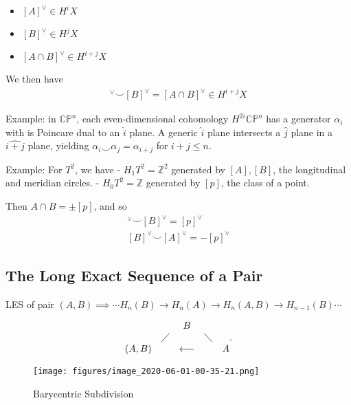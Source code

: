 \begin{itemize}
\tightlist
\item
  \([A]^\vee\in H^i X\)
\item
  \([B]^\vee\in H^j X\)
\item
  \([A\cap B]^\vee\in H^{i+j}X\)
\end{itemize}

We then have
\begin{align*}
[A]^\vee\smile [B]^\vee= [A\cap B]^\vee\in H^{i+j} X
\end{align*}

Example: in \({\mathbb{CP}}^n\), each even-dimensional cohomology
\(H^{2i}{\mathbb{CP}}^n\) has a generator \(\alpha_i\) with is Poincare
dual to an \(\widehat{i}\) plane. A generic \(\widehat{i}\) plane
intersects a \(\widehat{j}\) plane in a \(\widehat{i+j}\) plane,
yielding \(\alpha_i \smile \alpha_j = \alpha_{i+j}\) for \(i+j \leq n\).

Example: For \(T^2\), we have - \(H_1T^2 = {\mathbb{Z}}^2\) generated by
\([A], [B]\), the longitudinal and meridian circles. -
\(H_0T^2 = {\mathbb{Z}}\) generated by \([p]\), the class of a point.

Then \(A\cap B = \pm [p]\), and so
\begin{align*}
[A]^\vee\smile [B]^\vee= [p]^\vee\\
[B]^\vee\smile [A]^\vee= -[p]^\vee
\end{align*}

\hypertarget{the-long-exact-sequence-of-a-pair}{%
\subsection{The Long Exact Sequence of a
Pair}\label{the-long-exact-sequence-of-a-pair}}

LES of pair
\((A,B) \implies \cdots H_n(B) \to H_n(A) \to H_n(A,B) \to H_{n-1}(B) \cdots\)

\begin{align*} \begin{matrix}   && B & \\ &\diagup &  & \diagdown \\ (A,B) & & \longleftarrow &  & A \end{matrix} .\end{align*}

\begin{figure}
\centering
\texttt{[image: figures/image\_2020-06-01-00-35-21.png]}
\caption{Barycentric Subdivision}
\end{figure}

